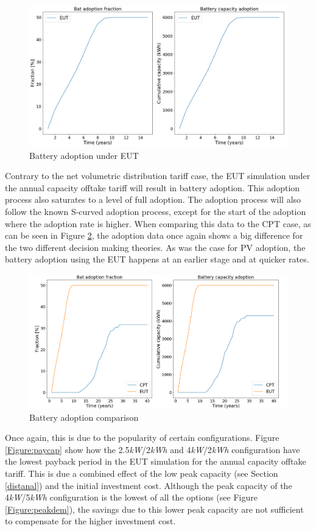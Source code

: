 \begin{figure}[h!]
\centering
\includegraphics[width=14cm]{EUTCompar/BatEUTCap}
\caption{Battery adoption under EUT}
\label{Figure:bateutcap}
\end{figure}
\newline
\noindent 
Contrary to the net volumetric distribution tariff case, the EUT simulation under the annual capacity offtake tariff will result in battery adoption. This adoption process also saturates to a level of full adoption. The adoption process will also follow the known S-curved adoption process, except for the start of the adoption where the adoption rate is higher. When comparing this data to the CPT case, as can be seen in Figure \ref{Figure:batcomparcap}, the adoption data once again shows a big difference for the two different decision making theories. As was the case for PV adoption, the battery adoption using the EUT happens at an earlier stage and at quicker rates.
\begin{figure}[h!]
\centering
\includegraphics[width=14cm]{EUTCompar/BatCap.png}
\caption{Battery adoption comparison}
\label{Figure:batcomparcap}
\end{figure}
\noindent 
Once again, this is due to the popularity of certain configurations. Figure \ref{Figure:paycap} show how the 2.5\textit{kW}/2\textit{kWh} and 4\textit{kW}/2\textit{kWh} configuration have the lowest payback period in the EUT simulation for the annual capacity offtake tariff. This is due a combined effect of the low peak capacity (see Section \ref{distanal}) and the initial investment cost. Although the peak capacity of the 4\textit{kW}/5\textit{kWh} configuration is the lowest of all the options (see Figure \ref{Figure:peakdem}), the savings due to this lower peak capacity are not sufficient to compensate for the higher investment cost. 
